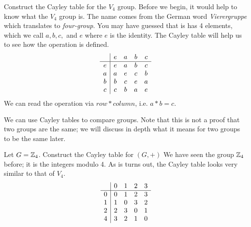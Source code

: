 \begin{example}{Construct the Cayley table for the $V_{4}$ group.}
	Before we begin, it would help to know what the $V_{4}$ group is. The name comes from the German word \textit{Vierergruppe} which translates to \textit{four-group}. You may have guessed that is has 4 elements, which we call $a,b,c,$ and $e$ where $e$ is the identity. The Cayley table will help us to see how the operation is defined.
	\[
		\begin{array}{c | c c c c}
			& e & a & b & c\\
			\hline
			e & e & a & b & c\\
			a & a & e & c & b\\
			b & b & c & e & a\\
			c & c & b & a & e
		\end{array}
	\]
	We can read the operation via $row * column$, i.e. $a * b=c$.
\end{example}

We can use Cayley tables to compare groups. Note that this is not a proof that two groups are the same; we will discuss in depth what it means for two groups to be the same later.

\begin{example}{Let $G=\mathbb{Z}_{4}$. Construct the Cayley table for $(G,+)$}
	We have seen the group $\mathbb{Z}_{4}$ before; it is the integers modulo 4. As is turns out, the Cayley table looks very similar to that of $V_{4}$.
	\[
		\begin{array}{c | c c c c}
			& 0 & 1 & 2 & 3\\
			\hline
			0 & 0 & 1 & 2 & 3\\
			1 & 1 & 0 & 3 & 2\\
			2 & 2 & 3 & 0 & 1\\
			4 & 3 & 2 & 1 & 0
		\end{array}
	\]
\end{example}

